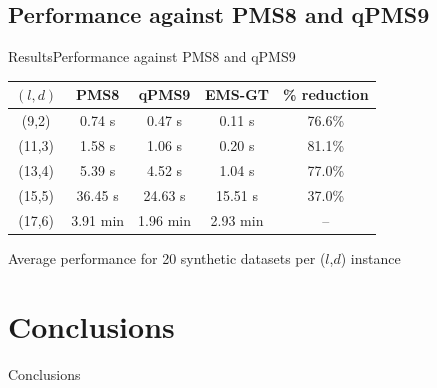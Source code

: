 \documentclass[pdf,xcolor={dvipsnames}]{beamer}
\begin{document}
	\subsection{Performance against PMS8 and qPMS9}
	\begin{frame}{Results}{Performance against PMS8 and qPMS9}

		\begin{table}[ht] %
			\small
			\renewcommand{\arraystretch}{1.3}
			\label{tbl:runtimes_v_pms}
			\centering
			\begin{tabular}{|c|c|c|c|c|}
			\hline \bfseries{\boldmath $(l,d)$} & \bfseries PMS8 & \bfseries qPMS9 & \bfseries EMS-GT & \bfseries \% reduction\\
			\hline
			 (9,2) &  0.74 s  &  0.47 s & {\color{blue} 0.11 s} & 76.6\%\\
			(11,3) &  1.58 s  &  1.06 s & {\color{blue} 0.20 s} & 81.1\%\\
			(13,4) &  5.39 s  &  4.52 s & {\color{blue} 1.04 s} & 77.0\%\\
			(15,5) & 36.45 s  & 24.63 s & {\color{blue}15.51 s} & 37.0\%\\
			(17,6) &  3.91 min & {\color{blue}1.96 min} & {2.93 min} & --\\
			\hline\end{tabular}
			\end{table}

		{\centering \footnotesize Average performance for 20 synthetic datasets per ($l$,$d$) instance \\}

		\end{frame}

\section{Conclusions}
	\begin{frame}{Conclusions}

		\end{frame}
\end{document}
